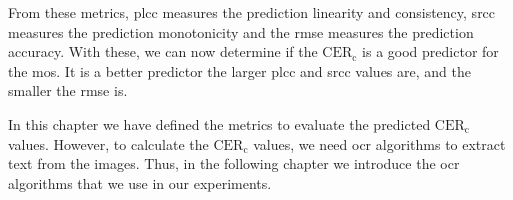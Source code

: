 From these metrics, \gls{plcc} measures the prediction linearity and consistency, \gls{srcc} measures the prediction monotonicity and the \gls{rmse} measures the prediction accuracy.
With these, we can now determine if the $\text{CER}_{\text{c}}$ is a good predictor for the \gls{mos}.
It is a better predictor the larger \gls{plcc} and \gls{srcc} values are, and the smaller the \gls{rmse} is.

In this chapter we have defined the metrics to evaluate the predicted $\text{CER}_{\text{c}}$ values.
However, to calculate the $\text{CER}_{\text{c}}$ values, we need \gls{ocr} algorithms to extract text from the images.
Thus, in the following chapter we introduce the \gls{ocr} algorithms that we use in our experiments.
